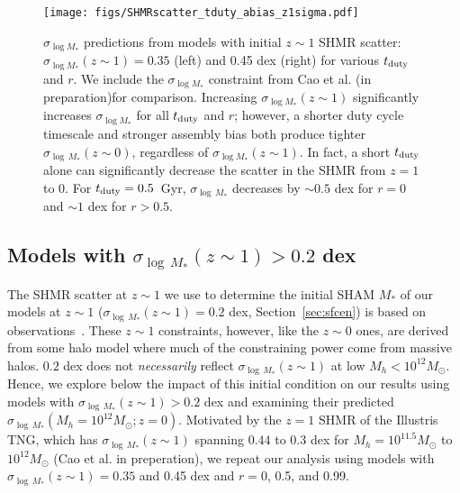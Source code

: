 \documentclass[12pt, letterpaper, preprint, tighten]{aastex62}
\newcommand{\edt}[1]{{\color{dred}{\bf} #1}}
\newcommand{\cao}{Cao et al. (in preparation)}
\newcommand{\tduty}{t_{\rm duty}}
\newcommand{\siglogm}{\sigma_{\log M_*}}
\begin{document}
\begin{figure}
\begin{center}
    \texttt{[image: figs/SHMRscatter\_tduty\_abias\_z1sigma.pdf]}
    \caption{\edt{$\siglogm$ predictions from models with initial $z\sim1$ SHMR 
    scatter: $\siglogm(z\sim1) = 0.35$ (left) and 0.45 dex (right) for various 
    $\tduty$ and $r$. We include the $\siglogm$ constraint from \cao for comparison.
    Increasing $\siglogm(z\sim1)$ significantly increases $\siglogm$ for all 
    $\tduty$ and $r$; however, a shorter duty cycle timescale and stronger assembly 
    bias both produce tighter $\sigma_{\log\,M_*}(z\sim0)$, regardless of $\siglogm(z\sim1)$.
    In fact, a short $\tduty$ alone can significantly decrease the scatter in the 
    SHMR from $z=1$ to 0. For $\tduty=0.5$~Gyr, $\sigma_{\log\,M_*}$ decreases by 
    $\sim 0.5$ dex for $r=0$ and $\sim 1$ dex for $r > 0.5$. 
    }}
\label{fig:sM_duty_abias_z1}
\end{center}
\end{figure}

\subsection{\edt{Models with  $\sigma_{\log\,M_*}(z\sim1) > 0.2$ dex}}
\edt{
The SHMR scatter at $z\sim1$ we use to determine the initial SHAM $M_*$ of our models 
at $z\sim1$ ($\sigma_{\log\,M_*}(z\sim1) = 0.2$ dex, Section~\ref{sec:sfcen}) is based on 
observations~\citep[\emph{e.g.}][]{leauthaud2012, tinker2013, patel2015}. These $z\sim1$ 
constraints, however, like the $z\sim0$ ones, are derived from some halo model where 
much of the constraining power come from massive halos. $0.2$ dex does not {\em necessarily} 
reflect $\sigma_{\log\,M_*}(z\sim1)$ at low $M_h < 10^{12}M_\odot$. Hence, we explore 
below the impact of this initial condition on our results using models with 
$\sigma_{\log\,M_*}(z\sim1) > 0.2$ dex and examining their predicted $\sigma_{\log\,M_*}(M_h=10^{12}M_\odot; z=0)$. 
Motivated by the $z=1$ SHMR of the Illustris TNG, which has $\sigma_{\log\,M_*}(z\sim1)$ 
spanning $0.44$ to $0.3$ dex for $M_h = 10^{11.5}M_\odot$ to $10^{12}M_\odot$ (Cao et al. 
in preperation), we repeat our analysis using models with $\sigma_{\log\,M_*}(z\sim1) = 0.35$ 
and 0.45 dex and $r=0$, 0.5, and 0.99.
}
\end{document}
